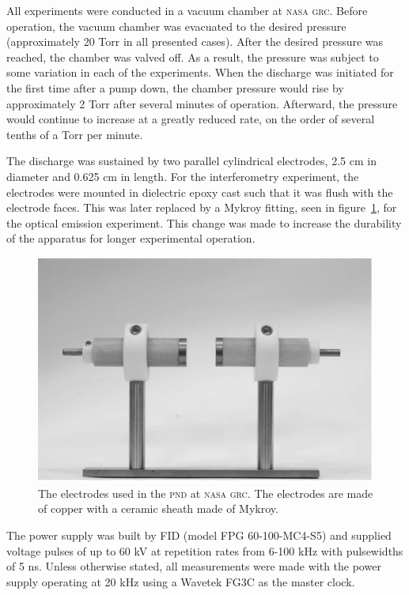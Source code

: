 All experiments were conducted in a vacuum chamber at \textsc{nasa grc}. Before
operation, the vacuum chamber was evacuated to the desired pressure
(approximately 20 Torr in all presented cases). After the desired pressure was
reached, the chamber was valved off. As a result, the pressure was subject to
some variation in each of the experiments. When the discharge was initiated for
the first time after a pump down, the chamber pressure would rise by
approximately 2 Torr after several minutes of operation. Afterward, the pressure
would continue to increase at a greatly reduced rate, on the order of several
tenths of a Torr per minute.

The discharge was sustained by two parallel cylindrical electrodes, 2.5 cm in
diameter and 0.625 cm in length. For the interferometry experiment, the
electrodes were mounted in dielectric epoxy cast such that it was flush with the
electrode faces. This was later replaced by a Mykroy fitting, seen in
figure~\ref{fig:electrodes}, for the optical emission experiment. This change
was made to increase the durability of the apparatus for longer experimental
operation.
\begin{figure}
  \centering
  \includegraphics{./figures/electrodes.pdf}
  \caption{The electrodes used in the \textsc{pnd} at \textsc{nasa grc}. The
    electrodes are made of copper with a ceramic sheath made of
    Mykroy.}
  \label{fig:electrodes}
\end{figure}
The power supply was built by FID (model FPG 60-100-MC4-S5) and supplied voltage
pulses of up to 60 kV at repetition rates from 6-100 kHz with pulsewidths of 5
ns. Unless otherwise stated, all measurements were made with the power supply
operating at 20 kHz using a Wavetek FG3C as the master clock.
